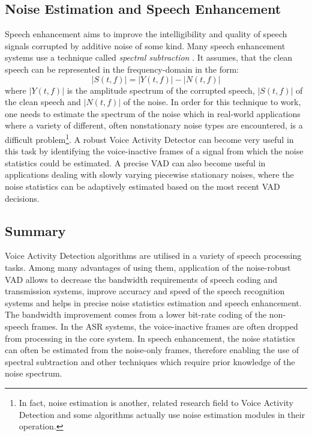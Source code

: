 \subsection{Noise Estimation and Speech Enhancement}

Speech enhancement aims to improve the intelligibility and quality of speech signals corrupted by additive noise of some kind. Many speech enhancement systems use a technique called \emph{spectral subtraction} \cite{Kondoz, RamirezGorriz}. It assumes, that the clean speech can be represented in the frequency-domain in the form:
\begin{equation}
|S(t,f)| = |Y(t,f)| - |N(t,f)|
\end{equation}
where $|Y(t,f)|$ is the amplitude spectrum of the corrupted speech, $|S(t,f)|$ of the clean speech and $|N(t,f)|$ of the noise. In order for this technique to work, one needs to estimate the spectrum of the noise which in real-world applications where a variety of different, often nonstationary noise types are encountered, is a difficult problem\footnote{In fact, noise estimation is another, related research field to Voice Activity Detection and some algorithms actually use noise estimation modules in their operation.}. A robust Voice Activity Detector can become very useful in this task by identifying the voice-inactive frames of a signal from which the noise statistics could be estimated. A precise VAD can also become useful in applications dealing with slowly varying piecewise stationary noises, where the noise statistics can be adaptively estimated based on the most recent VAD decisions.

\subsection{Summary}

Voice Activity Detection algorithms are utilised in a variety of speech processing tasks. Among many advantages of using them, application of the noise-robust VAD allows to decrease the bandwidth requirements of speech coding and transmission systems, improve accuracy and speed of the speech recognition systems and helps in precise noise statistics estimation and speech enhancement. The bandwidth improvement comes from a lower bit-rate coding of the non-speech frames. In the ASR systems, the voice-inactive frames are often dropped from processing in the core system. In speech enhancement, the noise statistics can often be estimated from the noise-only frames, therefore enabling the use of spectral subtraction and other techniques which require prior knowledge of the noise spectrum.

